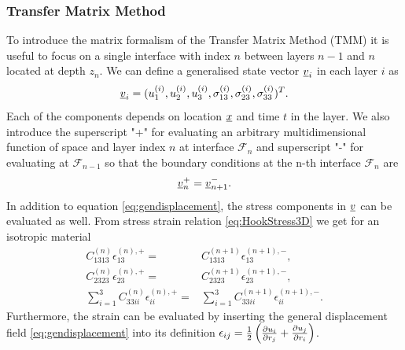 \subsubsection{Transfer Matrix Method}
To introduce the matrix formalism of the Transfer Matrix Method (TMM) it is
useful to focus on a single interface with index $n$ between layers $n-1$ and
$n$ located at depth $z_n$. We can define a generalised state vector
$\underline{v}_i$  in each layer $i$ as
\cite{Fomenko2014}
\begin{equation}
    \underline{v}_i = (u^{(i)}_1, u^{(i)}_2, u^{(i)}_3, \sigma^{(i)}_{13},
    \sigma^{(i)}_{23}, \sigma^{(i)}_{33})^T.
\end{equation}
Each of the components depends on location $\underline{x}$ and time $t$ in the
layer. We also introduce the superscript "+" for evaluating an arbitrary
multidimensional function of space and layer index $n$ at interface
$\mathcal{F}_n$ and superscript "-" for evaluating at $\mathcal{F}_{n-1}$ so
that the boundary conditions at the n-th interface $\mathcal{F}_n$ are
\begin{equation}
    \underline{v}_n^+ = \underline{v}_{n+1}^-.
\end{equation}
In addition to equation \ref{eq:gendisplacement}, the stress components in
$\underline{v}$ can be evaluated as well. From stress strain relation
\ref{eq:HookStress3D} we get for an isotropic material
\begin{align}
    C_{1313}^{(n)}\epsilon_{13}^{(n),+} =                     &
    C_{1313}^{(n+1)}\epsilon_{13}^{(n+1),-}        ,             \\[5pt]
    C_{2323}^{(n)}\epsilon_{23}^{(n),+} =                     &
    C_{2323}^{(n+1)}\epsilon_{23}^{(n+1),-}        ,             \\
    \sum\limits_{i=1}^3 C_{33ii}^{(n)}\epsilon_{ii}^{(n),+} = &
    \sum\limits_{i=1}^3 C_{33ii}^{(n+1)}\epsilon_{ii}^{(n+1),-}.
\end{align} %
Furthermore, the strain can be evaluated by inserting the general displacement
field \ref{eq:gendisplacement} into its definition $\epsilon_{ij} = \frac{1}{2}
    \left( \frac{\partial u_i}{\partial r_j} +\frac{\partial u_j}{\partial r_i} \right)$.

